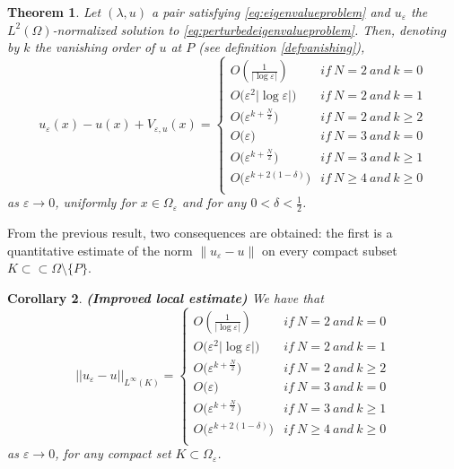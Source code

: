 \documentclass[11pt,reqno]{article}
\newtheorem{teo}{Theorem}[section]
\newtheorem{cor}[teo]{Corollary}
\numberwithin{equation}{section}
\newcommand\e\varepsilon
\renewcommand\O\Omega
\begin{document}
 \begin{teo}\label{intr-T1}
Let $(\lambda,u)$ a pair satisfying \eqref{eq:eigenvalueproblem} and $u_\e$ the $L^2(\Omega)$-normalized solution to \eqref{eq:perturbedeigenvalueproblem}. Then, denoting by $k$ the vanishing order of $u$ at $P$ (see definition \ref{defvanishing}),
     \begin{equation}\label{d0}
			u_\e(x)-u(x)+V_{\e,u}(x)= \begin{cases}
                O\left(\frac{1}{|\log\e|}\right)\quad& if  \ N=2  \ and\ k=0\\
                O\big(\e^2|\log\e|\big) & if  \ N=2  \ and\ k=1\\
                O\big(\e^{k+\frac{N}{2}}\big) & if  \ N=2  \ and\ k\ge 2\\
                O\big(\e\big) & if  \ N=3  \ and\ k=0\\
                O\big(\e^{k+\frac{N}{2}}\big) & if  \ N=3  \ and\ k\ge 1\\
                 O\big(\e^{k+ 2(1-\delta)}\big) & if  \ N\ge 4  \ and\ k\ge 0\\
			\end{cases}
		\end{equation}
		as $\e\to0$, uniformly for $x\in\O_\e$ and for any $0<\delta<\frac{1}{2}$.
	\end{teo}
From the previous result, two consequences are obtained: the first is a quantitative estimate of the norm $\|u_\varepsilon - u\|$ on every compact subset $K \subset\subset \Omega \setminus \{P\}$. 
\begin{cor}\label{T2'}{\bf (Improved local estimate)}
		We have that
		\begin{equation}\label{d1}
			||u_\e-u||_{L^\infty(K)}=\begin{cases}
                O\left(\frac{1}{|\log\e|}\right)\quad& if  \ N=2  \ and\ k=0\\
                O\big(\e^2|\log\e|\big) & if  \ N=2  \ and\ k=1\\
                O\big(\e^{k+\frac{N}{2}}\big) & if  \ N=2  \ and\ k\ge 2\\
                O\big(\e\big) & if  \ N=3  \ and\ k=0\\
                O\big(\e^{k+\frac{N}{2}}\big) & if  \ N=3  \ and\ k\ge 1\\
                 O\big(\e^{k+ 2(1-\delta)}\big) & if  \ N\ge 4  \ and\ k\ge 0\\
            \end{cases}
		\end{equation}
as $\e\to 0$,		for any compact set $K\subset\O_\e$.
	\end{cor}
\end{document}
